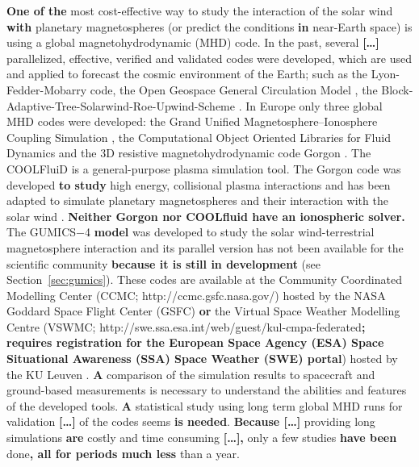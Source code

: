\documentclass[linenumbers,draft]{agujournal}
\begin{document}
\textbf{One of the} most cost-effective way to study the interaction of the solar wind \textbf{with} planetary magnetospheres (or predict the conditions \textbf{in} near-Earth space) is using a global magnetohydrodynamic (MHD) code. In the past, several \textbf{[\dots]} parallelized, effective, verified and validated codes were developed, which are used and applied to forecast the cosmic environment of the Earth; such as the Lyon-Fedder-Mobarry \citep[LFM;][]{lyon04:_lyon_fedder_mobar_lfm_mhd} code, the Open Geospace General Circulation Model \citep[OpenGGCM;][]{raeder08:_openg_simul_themis_mission}, the Block-Adaptive-Tree-Solarwind-Roe-Upwind-Scheme \citep[BATS-R-US;][]{powell99:_solut_adapt_upwin_schem_ideal_magnet,toth12:_adapt}. In Europe only three global MHD codes were developed: the Grand Unified Magnetosphere--Ionosphere Coupling Simulation \citep[GUMICS$-$4;][]{janhunen12:_gumic_mhd}, the Computational Object Oriented Libraries for Fluid Dynamics \citep[COOLFluiD;][]{lani12:_coolf_open_comput_platf_aerot} and the 3D resistive magnetohydrodynamic code Gorgon \citep{chittenden04:_x_z,ciardi07}. The COOLFluiD is a general-purpose plasma simulation tool. The Gorgon code was developed \textbf{to study} high energy, collisional plasma interactions and has been adapted to simulate planetary magnetospheres and their interaction with the solar wind \citep{mejnertsen16:_global_mhd_neptun,mejnertsen18:_global_mhd_simul_earth_bow}. \textbf{Neither Gorgon nor COOLfluid have an ionospheric solver.} The GUMICS$-$4 \textbf{model} was developed to study the solar wind-terrestrial magnetosphere interaction and its parallel version has not been available for the scientific community \textbf{because it is still in development} (see Section~\ref{sec:gumics}). These codes are available at the Community Coordinated Modelling Center (CCMC; http://ccmc.gsfc.nasa.gov/) hosted by the NASA Goddard Space Flight Center (GSFC) \textbf{or} the Virtual Space Weather Modelling Centre (VSWMC; http://swe.ssa.esa.int/web/guest/kul-cmpa-federated\textbf{; requires registration for the European Space Agency (ESA) Space Situational Awareness (SSA) Space Weather (SWE) portal}) hosted by the KU Leuven \citep{poedts20:_virtual_space_weath_model_centr}. \textbf{A} comparison of the simulation results to spacecraft and ground-based measurements is necessary to understand the abilities and features of the developed tools. \textbf{A} statistical study using long term global MHD runs for validation \textbf{[\dots]} of the codes seems \textbf{is needed}. \textbf{Because [\dots]} providing long simulations \textbf{are} costly and time consuming \textbf{[\dots],} only a few studies \textbf{have been} done\textbf{, all for periods much less} than a year. 
\end{document}
